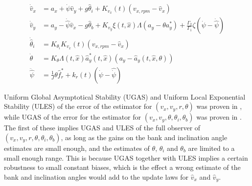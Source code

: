 \begin{align}
    \dot{\hat{v}}_x & = a_x + \dot{\psi}\hat{v}_y + g\hat{\theta}_i + K_{v_x}(t)(v_{x,rpm} - \hat{v}_x) \\
    \dot{\hat{v}}_y & = a_y - \dot{\hat{\psi}}\hat{v}_x - g\hat{\theta}_b + K_{v_y}\xi(t,\hat{x})\Lambda(a_y - \theta a_y^{*}) + \frac{\Gamma_2}{\Gamma_1}\zeta(\dot{\psi} - \dot{\hat{\psi}}) \\ 
    \dot{\hat{\theta}}_i & = K_{\theta_i}K_{v_x}(t)(v_{x,rpm} - \hat{v}_x) \\
    \dot{\theta} & = K_{\theta}\Lambda (t, \hat{x})\hat{a}_y^*(t,\hat{x})(a_y - \hat{a}_y(t,\hat{x},\theta)) \\ 
    \ddot{\hat{\psi}} & = \frac{1}{J}\theta \hat{f}_r^* + k_r(t)(\dot{\psi}-\hat{\dot{\psi}})
\end{align}

Uniform Global Asymptotical Stability (UGAS) and Uniform Local Exponential Stability (ULES) of the error of the estimator for $(v_x,v_y,r,\theta)$ was proven in \cite{Automatica08}, while UGAS of the error for the estimator for $(v_x,v_y,\theta, \theta_i, \theta_b)$ was proven in \cite{MainStateEst}. The first of these implies UGAS and ULES of the full observer of $(v_x,v_y, r,\theta, \theta_i, \theta_b)$, as long as the gains on the bank and inclination angle estimates are small enough, and the estimates of $\theta$, $\theta_i$ and $\theta_b$ are limited to a small enough range. This is because UGAS together with ULES implies a certain robustness to small constant biases, which is the effect a wrong estimate of the bank and inclination angles would add to the update laws for $\hat{v}_x$ and $\hat{v}_y$. 
